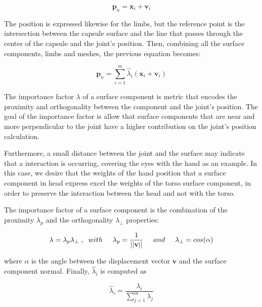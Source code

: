 \documentclass{vgtc}
\begin{document}
\begin{equation}
\label{eq:egocoord_jointpos1}
\mathbf{p}_n = \mathbf{x}_i + \mathbf{v}_i
\end{equation}

The position is expressed likewise for the limbs, but the reference
point is the intersection between the capsule surface and the line that
passes through the center of the capsule and the joint's position. Then,
combining all the surface components, limbs and meshes, the previous
equation becomes:

\begin{equation}
\label{eq:egocoord_jointpos2}
\mathbf{p}_n = \sum_{i=1}^{m}\hat{\lambda}_{i}(\mathbf{x}_i + \mathbf{v}_i)
\end{equation}

The importance factor \(\lambda\) of a surface component is metric that
encodes the proximity and orthogonality between the component and the
joint's position. The goal of the importance factor is allow that
surface components that are near and more perpendicular to the joint
have a higher contribution on the joint's position calculation.

Furthermore, a small distance between the joint and the surface may
indicate that a interaction is occurring, covering the eyes with the
hand as an example. In this case, we desire that the weights of the hand
position that a surface component in head express excel the weights of
the torso surface component, in order to preserve the interaction
between the head and not with the torso.

The importance factor of a surface component is the combination of the
proximity \(\lambda_p\) and the orthogonality \(\lambda_{\perp}\)
properties:

\begin{equation}
\label{eq:importance}
\lambda = \lambda_p \lambda_{\perp}\hspace{0.1cm},\hspace{0.2cm} with \hspace{0.5cm}\lambda_p =  \frac{1}{||\mathbf{v}||}\hspace{0.5cm} and \hspace{0.5cm}\lambda_{\perp} = cos(\alpha)
\end{equation}

where \(\alpha\) is the angle between the displacement vector
\(\mathbf{v}\) and the surface component normal. Finally,
\(\hat{\lambda}_{i}\) is computed as

\begin{equation}
\label{eq:importance_ortho}
\hat{\lambda}_{i} = \frac{\lambda_{i}}{\sum_{j=1}^{m}\lambda_{j}}
\end{equation}
\end{document}
